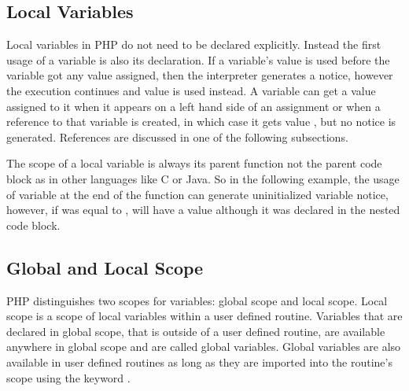     \subsection{Local Variables}
    Local variables in PHP do not need to be declared explicitly. 
    Instead the first usage of a variable is also its declaration. 
    If a variable's value is used before the variable got any 
    value assigned, then the interpreter generates a notice, 
    however the execution continues and value  is 
    used instead. A variable can get a value assigned to it when it 
    appears on a left hand side of an assignment or when a 
    reference to that variable is created, in which case it gets value 
    , but no notice is generated. References are 
    discussed in one of the following subsections.

    The scope of a local variable is always its parent function not the 
    parent code block as in other languages like C or Java. 
    So in the following 
    example, the usage of variable  at the end 
    of the function can generate uninitialized variable notice, 
    however, if  was equal to , 
     will have a value although it 
    was declared in the nested code block.

    
    \subsection{Global and Local Scope}
    PHP distinguishes two scopes for variables: global scope and 
    local scope. Local scope is a scope of local variables 
    within a user defined routine.         
    Variables that are declared 
    in global scope, that is outside of a user defined routine, 
    are available anywhere in global scope and are called 
    global variables. Global variables are also available 
    in user defined routines as long as they are imported 
    into the routine's scope using the keyword .
    


